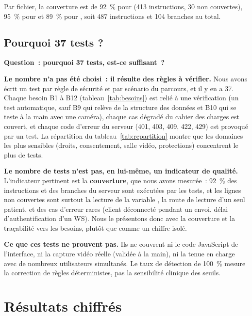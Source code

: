 Par fichier, la couverture est de 92~\% pour  (413 instructions, 30 non couvertes), 95~\% pour  et 89~\% pour , soit 487 instructions et 104 branches au total.

\subsection{Pourquoi 37 tests ?}

\begin{callout}
\textbf{Question~: pourquoi 37 tests, est-ce suffisant~?}

\textbf{Le nombre n'a pas été choisi~: il résulte des règles à vérifier.} Nous avons écrit un test par règle de sécurité et par scénario du parcours, et il y en a 37. Chaque besoin B1 à B12 (tableau~\ref{tab:besoins}) est relié à une vérification (un test automatique, sauf B9 qui relève de la structure des données et B10 qui se teste à la main avec une caméra), chaque cas dégradé du cahier des charges est couvert, et chaque code d'erreur du serveur (401, 403, 409, 422, 429) est provoqué par un test. La répartition du tableau~\ref{tab:repartition} montre que les domaines les plus sensibles (droits, consentement, salle vidéo, protections) concentrent le plus de tests.

\textbf{Le nombre de tests n'est pas, en lui-même, un indicateur de qualité.} L'indicateur pertinent est la \textbf{couverture}, que nous avons mesurée~: 92~\% des instructions et des branches du serveur sont exécutées par les tests, et les lignes non couvertes sont surtout la lecture de la variable , la route de lecture d'un seul patient, et des cas d'erreur rares (client déconnecté pendant un envoi, délai d'authentification d'un \ac{WS}). Nous le présentons donc avec la couverture et la traçabilité vers les besoins, plutôt que comme un chiffre isolé.

\textbf{Ce que ces tests ne prouvent pas.} Ils ne couvrent ni le code JavaScript de l'interface, ni la capture vidéo réelle (validée à la main), ni la tenue en charge avec de nombreux utilisateurs simultanés. Le taux de détection de 100~\% mesure la correction de règles déterministes, pas la sensibilité clinique des seuils.
\end{callout}

\section{Résultats chiffrés}

